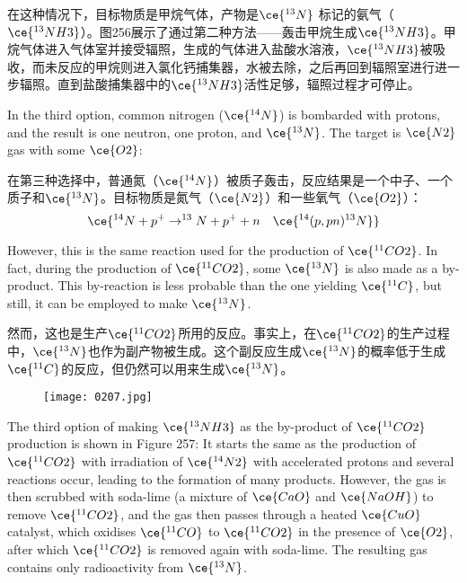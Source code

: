 \documentclass[dvipsnames, svgnames,a4paper,11pt]{article}
\begin{document}
在这种情况下，目标物质是甲烷气体，产物是\(\ce{^{13}N}\) 标记的氨气（\(\ce{^{13}NH3}\)）。图256展示了通过第二种方法——轰击甲烷生成\(\ce{^{13}NH3}\)。甲烷气体进入气体室并接受辐照，生成的气体进入盐酸水溶液，\(\ce{^{13}NH3}\)被吸收，而未反应的甲烷则进入氯化钙捕集器，水被去除，之后再回到辐照室进行进一步辐照。直到盐酸捕集器中的\(\ce{^{13}NH3}\)活性足够，辐照过程才可停止。  

In the third option, common nitrogen (\(\ce{^{14}N}\)) is bombarded with protons, and the result is one neutron, one proton, and \(\ce{^{13}N}\). The target is \(\ce{N2}\) gas with some \(\ce{O2}\):

在第三种选择中，普通氮（\(\ce{^{14}N}\)）被质子轰击，反应结果是一个中子、一个质子和\(\ce{^{13}N}\)。目标物质是氮气（\(\ce{N2}\)）和一些氧气（\(\ce{O2}\)）：
\[
\ce{^{14}N + p^+ \rightarrow ^{13}N + p^+ + n \quad \ce{^{14}(p,pn)^{13}N}}
\]

However, this is the same reaction used for the production of \(\ce{^{11}CO2}\). In fact, during the production of \(\ce{^{11}CO2}\), some \(\ce{^{13}N}\) is also made as a by-product. This by-reaction is less probable than the one yielding \(\ce{^{11}C}\), but still, it can be employed to make \(\ce{^{13}N}\).

然而，这也是生产\(\ce{^{11}CO2}\)所用的反应。事实上，在\(\ce{^{11}CO2}\)的生产过程中，\(\ce{^{13}N}\)也作为副产物被生成。这个副反应生成\(\ce{^{13}N}\)的概率低于生成\(\ce{^{11}C}\)的反应，但仍然可以用来生成\(\ce{^{13}N}\)。

\begin{figure}[h]
	\centering
    \texttt{[image: 0207.jpg]}  
     \label{fig257}
\end{figure}

The third option of making \(\ce{^{13}NH3}\) as the by-product of \(\ce{^{11}CO2}\) production is shown in Figure 257: It starts the same as the production of \(\ce{^{11}CO2}\) with irradiation of \(\ce{^{14}N2}\) with accelerated protons and several reactions occur, leading to the formation of many products. However, the gas is then scrubbed with soda-lime (a mixture of \(\ce{CaO}\) and \(\ce{NaOH}\)) to remove \(\ce{^{11}CO2}\), and the gas then passes through a heated \(\ce{CuO}\) catalyst, which oxidises \(\ce{^{11}CO}\) to \(\ce{^{11}CO2}\) in the presence of \(\ce{O2}\), after which \(\ce{^{11}CO2}\) is removed again with soda-lime. The resulting gas contains only radioactivity from \(\ce{^{13}N}\).
\end{document}
